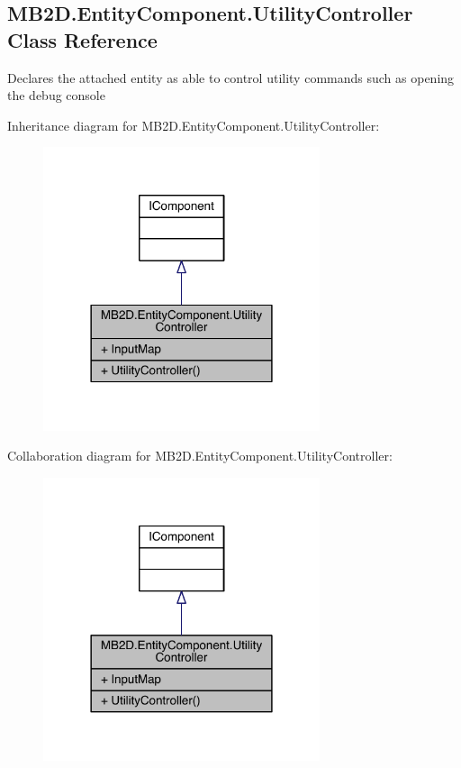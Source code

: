 \hypertarget{class_m_b2_d_1_1_entity_component_1_1_utility_controller}{}\subsection{M\+B2\+D.\+Entity\+Component.\+Utility\+Controller Class Reference}
\label{class_m_b2_d_1_1_entity_component_1_1_utility_controller}


Declares the attached entity as able to control utility commands such as opening the debug console  




Inheritance diagram for M\+B2\+D.\+Entity\+Component.\+Utility\+Controller\+:
\nopagebreak
\begin{figure}[H]
\begin{center}
\leavevmode
\includegraphics[width=230pt]{class_m_b2_d_1_1_entity_component_1_1_utility_controller__inherit__graph}
\end{center}
\end{figure}


Collaboration diagram for M\+B2\+D.\+Entity\+Component.\+Utility\+Controller\+:
\nopagebreak
\begin{figure}[H]
\begin{center}
\leavevmode
\includegraphics[width=230pt]{class_m_b2_d_1_1_entity_component_1_1_utility_controller__coll__graph}
\end{center}
\end{figure}
